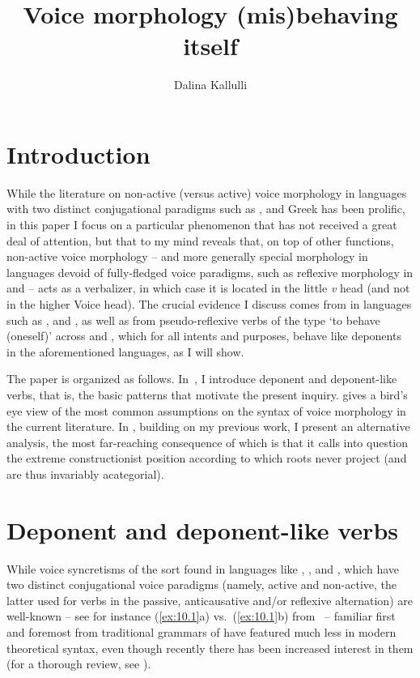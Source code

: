\documentclass[output=paper]{langsci/langscibook}
\author{Dalina Kallulli\affiliation{University of Vienna}}
\title{Voice morphology (mis)behaving itself}
\begin{document}
\glsresetall
\maketitle

\section{Introduction}\label{sec:10.1}

While the literature on non-active (versus active) voice morphology in
languages with two distinct conjugational paradigms such as ,  and
Greek has been prolific, in this paper I focus on a particular phenomenon that
has not received a great deal of attention, but that to my mind reveals that,
on top of other functions, non-active voice morphology -- and more generally
special morphology in languages devoid of fully-fledged voice paradigms, such
as reflexive morphology in  and  -- acts as a verbalizer, in
which case it is located in the little \emph{v} head (and not in the higher
Voice head). The crucial evidence I discuss comes from  in
languages such as ,  and , as well as from pseudo-reflexive
verbs of the type ‘to behave (oneself)’ across  and , which for
all intents and purposes, behave like deponents in the aforementioned
languages, as I will show.

The paper is organized as follows. In~, I introduce deponent
and deponent-like verbs, that is, the basic patterns that motivate the present
inquiry.  gives a bird’s eye view of the most common
assumptions on the syntax of voice morphology in the current literature. In
, building on my previous work, I present an alternative
analysis, the most far-reaching consequence of which is that it calls into
question the extreme constructionist position according to which roots never
project (and are thus invariably acategorial).

\section{Deponent and deponent-like verbs}\label{sec:10.2}

While voice syncretisms of the sort found in languages like , ,
and , which have two distinct conjugational voice paradigms (namely,
active and non-active, the latter used for verbs in the passive, anticausative
and/or reflexive alternation) are well-known -- see for instance (\ref{ex:10.1}a)
vs.\ (\ref{ex:10.1}b) from ~--  familiar first and foremost
from traditional grammars of  have featured much less in modern
theoretical syntax, even though recently there has been increased interest in
them (for a thorough review, see \citealt{Grestenberger2014}).
\end{document}
